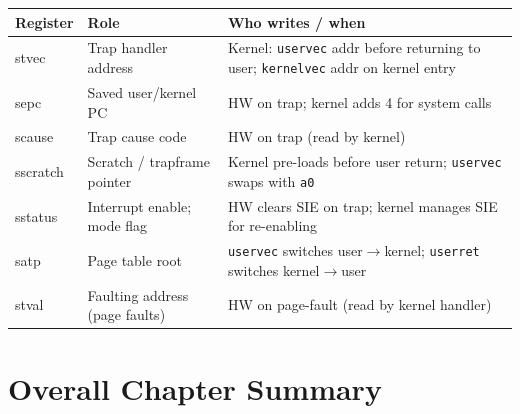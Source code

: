 \documentclass[11pt, a4paper]{article}
\begin{document}
\begin{center}
\renewcommand{\arraystretch}{1.3}
\begin{tabular}{@{}>{\ttfamily}lp{5.2cm}p{5.5cm}@{}}
\toprule
\textbf{Register} & \textbf{Role} & \textbf{Who writes / when} \\
\midrule
stvec    & Trap handler address          & Kernel: \lstinline|uservec| addr before returning to user; \lstinline|kernelvec| addr on kernel entry \\
sepc     & Saved user/kernel PC          & HW on trap; kernel adds 4 for system calls \\
scause   & Trap cause code               & HW on trap (read by kernel) \\
sscratch & Scratch / trapframe pointer   & Kernel pre-loads before user return; \lstinline|uservec| swaps with \lstinline|a0| \\
sstatus  & Interrupt enable; mode flag   & HW clears SIE on trap; kernel manages SIE for re-enabling \\
satp     & Page table root               & \lstinline|uservec| switches user$\to$kernel; \lstinline|userret| switches kernel$\to$user \\
stval    & Faulting address (page faults) & HW on page-fault (read by kernel handler) \\
\bottomrule
\end{tabular}
\end{center}

\section{Overall Chapter Summary}
\end{document}
